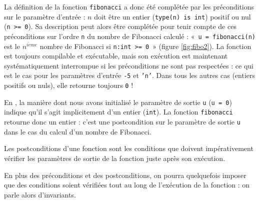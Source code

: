 \noindent La définition de la fonction {\tt fibonacci} a donc été complétée par les préconditions
sur le paramètre d'entrée : $n$ doit être un entier ({\tt type(n) is int})
positif ou nul ({\tt n >= 0}). 
Sa description peut alors être complétée pour tenir compte de ces préconditions 
sur l'ordre {\tt n} du nombre de Fibonacci calculé :
«~{\tt u = fibonacci(n)} est le $n^{i\grave eme}$ nombre de Fibonacci si
{\tt n:int >= 0}~» (figure \ref{fig:fibo2}).
La fonction est toujours compilable et exécutable, mais son
exécution est maintenant systématiquement interrompue si les préconditions ne sont pas 
respectées : ce qui est le cas pour les paramètres d'entrée {\tt -5} et {\tt 'n'}.
Dans tous les autres cas (entiers positifs ou nuls), elle retourne toujours {\tt 0} !

En \python, la manière dont nous avons initialisé le paramètre de sortie {\tt u}
({\tt u = 0}) indique qu'il s'agit implicitement d'un entier ({\tt int}). La fonction
{\tt fibonacci} retourne donc un entier : c'est une postcondition 
sur le paramètre de sortie {\tt u} dans le cas du calcul d'un nombre de Fibonacci.

\begin{defin}[postcondition]
Les postconditions d'une fonction sont les conditions que doivent 
impérativement vérifier les paramètres de sortie de la fonction
juste après son exécution.
\end{defin}

En plus des préconditions et des postconditions, on pourra quelquefois imposer
que des conditions soient vérifiées tout au long de l'exécution de la fonction :
on parle alors d'invariants. 

